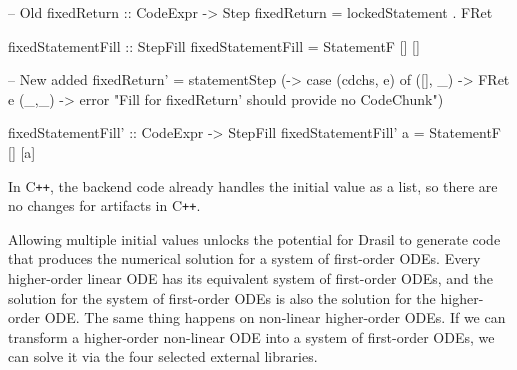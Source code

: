 \begin{listing}
\begin{haskell1}
-- Old 
fixedReturn :: CodeExpr -> Step
fixedReturn = lockedStatement . FRet

fixedStatementFill :: StepFill
fixedStatementFill = StatementF [] []

-- New added 
fixedReturn' = statementStep (\cdchs [e] -> case (cdchs, e) of
  ([], _) -> FRet e
  (_,_) -> error "Fill for fixedReturn' should provide no CodeChunk")

fixedStatementFill' :: CodeExpr -> StepFill
fixedStatementFill' a = StatementF [] [a]
\end{haskell1}
\label{code_fixedreturn}
\end{listing}

In C\texttt{++}, the backend code already handles the initial value as a list, so there are no changes for artifacts in C\texttt{++}.




Allowing multiple initial values unlocks the potential for Drasil to generate code that produces the numerical solution for a system of first-order ODEs. Every higher-order linear ODE has its equivalent system of first-order ODEs, and the solution for the system of first-order ODEs is also the solution for the higher-order ODE. The same thing happens on non-linear higher-order ODEs. If we can transform a higher-order non-linear ODE into a system of first-order ODEs, we can solve it via the four selected external libraries. 


